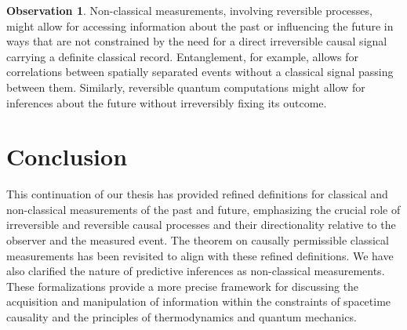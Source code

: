 \documentclass{article}
\theoremstyle{definition}
\newtheorem{observation}[definition]{Observation}
\begin{document}
	\begin{observation}
		Non-classical measurements, involving reversible processes, might allow for accessing information about the past or influencing the future in ways that are not constrained by the need for a direct irreversible causal signal carrying a definite classical record. Entanglement, for example, allows for correlations between spatially separated events without a classical signal passing between them. Similarly, reversible quantum computations might allow for inferences about the future without irreversibly fixing its outcome.
	\end{observation}
	
	\section{Conclusion}
	
	This continuation of our thesis has provided refined definitions for classical and non-classical measurements of the past and future, emphasizing the crucial role of irreversible and reversible causal processes and their directionality relative to the observer and the measured event. The theorem on causally permissible classical measurements has been revisited to align with these refined definitions. We have also clarified the nature of predictive inferences as non-classical measurements. These formalizations provide a more precise framework for discussing the acquisition and manipulation of information within the constraints of spacetime causality and the principles of thermodynamics and quantum mechanics.
	
\end{document}
